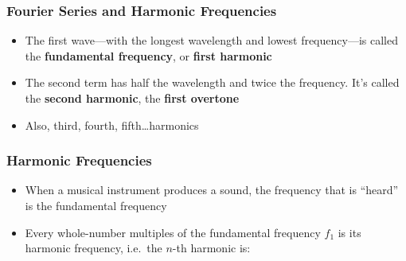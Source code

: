 \documentclass[12pt,aspectratio=169]{beamer}
\newcommand{\eq}[2]{\vspace{#1}{\Large\begin{displaymath}#2\end{displaymath}}}
\begin{document}
\begin{frame}
  \frametitle{Fourier Series and Harmonic Frequencies}

  \begin{center}
    \vspace{-.3in}
    \hspace{.15in}
    \hspace{.15in}
  \end{center}

  \vspace{-.2in}
  \begin{itemize}
  \item The first wave---with the longest wavelength and lowest
    frequency---is called the \textbf{fundamental frequency}, or
    \textbf{first harmonic}
  \item The second term has half the wavelength and twice the frequency. It's
    called the \textbf{second harmonic}, the \textbf{first overtone}
  \item Also, third, fourth, fifth\ldots harmonics
  \end{itemize}
\end{frame}


\begin{frame}
  \frametitle{Harmonic Frequencies}
  \begin{itemize}
  \item When a musical instrument produces a sound, the frequency that is
    ``heard'' is the fundamental frequency
  \item Every whole-number multiples of the fundamental frequency $f_1$ is its
    harmonic frequency, i.e.\ the $n$-th harmonic is:

    \eq{-.25in}{
      \boxed{f_{\mathrm{harm},n}=nf_1}\quad\text{\normalsize where}\quad
      n\geq 1
    }
  \end{itemize}
\end{frame}
\end{document}
